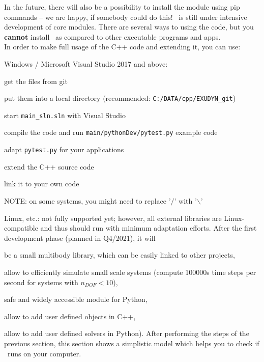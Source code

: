 In the future, there will also be a possibility to install the module using pip commands -- we are happy, if somebody could do this!
%
\codeName\ is still under intensive development of core modules.
There are several ways to using the code, but you {\bf cannot} install \codeName\ as compared to other executable programs and apps.
\vspace{6pt}\\
In order to make full usage of the C++ code and extending it, you can use:
\bi
	\item Windows / Microsoft Visual Studio 2017 and above:
	\bi
		\item get the files from git
		\item put them into a local directory (recommended: \texttt{C:/DATA/cpp/EXUDYN\_git})
		\item start \texttt{main\_sln.sln} with Visual Studio
		\item compile the code and run \texttt{main/pythonDev/pytest.py} example code
		\item adapt \texttt{pytest.py} for your applications
		\item extend the C++ source code
		\item link it to your own code
		\item NOTE: on some systems, you might need to replace '$/$' with '$\backslash$'
	\ei
	\item Linux, etc.: not fully supported yet; however, all external libraries are Linux-compatible and thus should run with minimum adaptation efforts.
\ei
%
After the first development phase (planned in Q4/2021), it will
\bi
  \item be a small multibody library, which can be easily linked to other projects,
	\item allow to efficiently simulate small scale systems (compute 100000s time steps per second for systems with $n_{DOF}<10$),
	\item safe and widely accessible module for Python,
	\item allow to add user defined objects in C++,
	\item allow to add user defined solvers in Python).
\ei
%
After performing the steps of the previous section, this section shows a simplistic model which helps you to check if \codeName\ runs on your computer.

